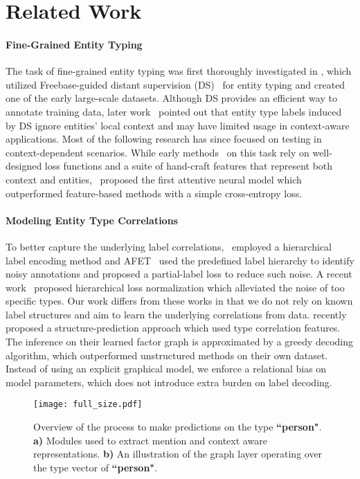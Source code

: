 \documentclass[11pt,a4paper]{article}
\begin{document}
\section{Related Work}
\paragraph{Fine-Grained Entity Typing} The task of fine-grained entity typing was first thoroughly investigated in \cite{ling2012fine}, which utilized Freebase-guided distant supervision (DS)~\cite{mintz2009distant} for entity typing and created one of the early large-scale datasets. Although DS provides an efficient way to annotate training data, later work~\cite{gillick2014context} pointed out that entity type labels induced by DS ignore entities' local context and may have limited usage in context-aware applications. Most of the following research has since focused on testing in context-dependent scenarios. While early methods~\cite{gillick2014context,yogatama2015embedding} on this task rely on well-designed loss functions and a suite of hand-craft features that represent both context and entities,~\citet{shimaoka2016attentive} proposed the first attentive neural model which outperformed feature-based methods with a simple cross-entropy loss.

\paragraph{Modeling Entity Type Correlations} To better capture the underlying label correlations,~\citet{shimaoka2016neural} employed a hierarchical label encoding method and AFET~\cite{ren2016afet} used the predefined label hierarchy to identify noisy annotations and proposed a partial-label loss to reduce such noise. A recent work~\cite{xu2018neural} proposed hierarchical loss normalization which alleviated the noise of too specific types. Our work differs from these works in that we do not rely on known label structures and aim to learn the underlying correlations from data. \citet{rabinovich2017fine} recently proposed a structure-prediction approach which used type correlation features. The inference on their learned factor graph is approximated by a greedy decoding algorithm, which outperformed unstructured methods on their own dataset. Instead of using an explicit graphical model, we enforce a relational bias on model parameters, which does not introduce extra burden on label decoding. 


\begin{figure*}[t]
\centering
\texttt{[image: full\_size.pdf]}
\caption{Overview of the process to make predictions on the type \textbf{``person"}. \textbf{a)} Modules used to extract mention and context aware representations. \textbf{b)} An illustration of the graph layer operating over the type vector of \textbf{``person"}.}
\label{model}
\end{figure*}
\end{document}
